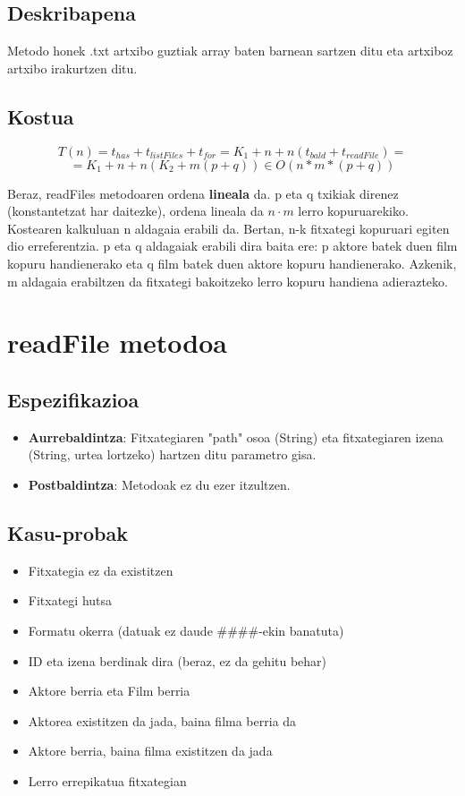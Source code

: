 \documentclass[a4paper,10pt]{report}
\begin{document}
	\subsection*{Deskribapena}
		Metodo honek .txt artxibo guztiak array baten barnean sartzen ditu eta artxiboz artxibo irakurtzen ditu.
	\subsection*{Kostua}
		\[
			T(n) = t_{has} + t_{listFiles} + t_{for} = K_{1} + n + n(t_{bald} + t_{readFile}) =
		\]
		\[
			= K_{1} + n + n(K_{2} + m(p+q)) \in O(n*m*(p+q))
		\]
		
		Beraz, readFiles metodoaren ordena \textbf{lineala} da. p eta q txikiak direnez (konstantetzat har daitezke), ordena lineala da $n·m$ lerro kopuruarekiko.\\
		Kostearen kalkuluan n aldagaia erabili da. Bertan, n-k fitxategi kopuruari egiten dio erreferentzia. p eta q aldagaiak erabili dira baita ere: p aktore batek duen film kopuru handienerako eta q film batek  duen aktore kopuru handienerako. Azkenik, m aldagaia erabiltzen da fitxategi bakoitzeko lerro kopuru handiena adierazteko.

\section{readFile metodoa}
	\subsection*{Espezifikazioa}
		\begin{itemize}
			\item \textbf{Aurrebaldintza}: Fitxategiaren "path" osoa (String) eta fitxategiaren izena (String, urtea lortzeko) hartzen ditu parametro gisa.
			\item \textbf{Postbaldintza}: Metodoak ez du ezer itzultzen.
		\end{itemize}
	\subsection*{Kasu-probak}
	\begin{itemize}
		\item Fitxategia ez da existitzen
		\item Fitxategi hutsa
		\item Formatu okerra (datuak ez daude \#\#\#\#-ekin banatuta)
		\item ID eta izena berdinak dira (beraz, ez da gehitu behar)
		\item Aktore berria eta Film berria
		\item Aktorea existitzen da jada, baina filma berria da
		\item Aktore berria, baina filma existitzen da jada
		\item Lerro errepikatua fitxategian
	\end{itemize}
\end{document}

